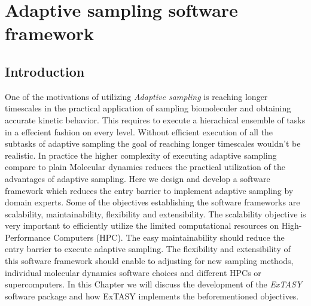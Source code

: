 \afterpage{\null\newpage}
\chapter{Adaptive sampling software framework\label{ch:chapter4}}
\section{\label{sec:intro4}Introduction}

One of the motivations of utilizing \emph{Adaptive sampling} is reaching longer timescales in the practical application of sampling biomoleculer and obtaining accurate kinetic behavior. This requires to execute a hierachical ensemble of tasks in a effecient fashion on every level. Without efficient execution of all the subtasks of adaptive sampling the goal of reaching longer timescales wouldn't be realistic. In practice the higher complexity of executing adaptive sampling compare to plain Molecular dynamics reduces the practical utilization of the advantages of adaptive sampling. Here we design and develop a software framework which reduces the entry barrier to implement adaptive sampling by domain experts. Some of the objectives establishing the software frameworks are scalability, maintainability, flexibility and extensibility.
The scalability objective is very important to efficiently utilize the limited computational resources on High-Performance Computers (HPC). The easy maintainability should reduce the entry barrier to execute adaptive sampling. The flexibility and extensibility of this software framework should enable to adjusting for new sampling methods, individual molecular dynamics software choices and different HPCs or supercomputers. In this Chapter we will discuss the development of the \emph{ExTASY} software package and how ExTASY implements the beforementioned objectives.

